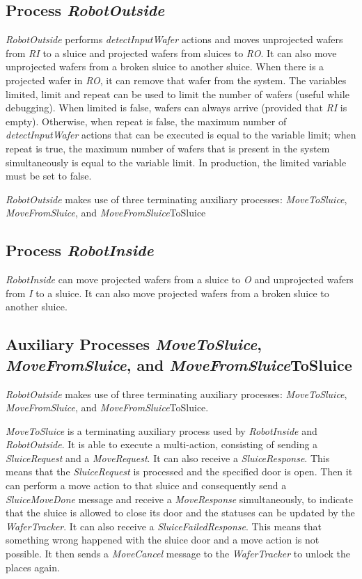 \subsection{Process \emph{RobotOutside}}

 \emph{RobotOutside} performs \emph{detectInputWafer} actions and moves unprojected wafers
 from \emph{RI} to a sluice and projected wafers from sluices to \emph{RO}. It can also
 move unprojected wafers from a broken sluice to another sluice. When there
 is a projected wafer in \emph{RO}, it can remove that wafer from the system. The
 variables limited, limit and repeat can be used to limit the number of
 wafers (useful while debugging). When limited is false, wafers can always
 arrive (provided that \emph{RI} is empty). Otherwise, when repeat is false, the
 maximum number of \emph{detectInputWafer} actions that can be executed is equal to
 the variable limit; when repeat is true, the maximum number of wafers that
 is present in the system simultaneously is equal to the variable limit.
 In production, the limited variable must be set to false.
 
 \emph{RobotOutside} makes use of three terminating auxiliary processes: \emph{MoveToSluice}, \emph{MoveFromSluice}, and \emph{MoveFromSluice}ToSluice
 
\subsection{Process \emph{RobotInside}}

 \emph{RobotInside} can move projected wafers from a sluice to \emph{O} and unprojected
 wafers from \emph{I} to a sluice. It can also move projected wafers from a broken
 sluice to another sluice.

 \subsection{Auxiliary Processes \emph{MoveToSluice}, \emph{MoveFromSluice}, and \emph{MoveFromSluice}ToSluice}

 \emph{RobotOutside} makes use of three terminating auxiliary processes: \emph{MoveToSluice}, \emph{MoveFromSluice}, and \emph{MoveFromSluice}ToSluice.
 
  \emph{MoveToSluice} is a terminating auxiliary process used by \emph{RobotInside} and
 \emph{RobotOutside}. It is able to execute a multi-action, consisting of sending
 a \emph{SluiceRequest} and a \emph{MoveRequest}. It can also receive a \emph{SluiceResponse}.
 This means that the \emph{SluiceRequest} is processed and the specified door is
 open. Then it can perform a move action to that sluice and consequently
 send a \emph{SluiceMoveDone} message and receive a \emph{MoveResponse} simultaneously, to
 indicate that the sluice is allowed to close its door and the statuses can
 be updated by the \emph{WaferTracker}. It can also receive a \emph{SluiceFailedResponse}.
 This means that something wrong happened with the sluice door and a move
 action is not possible. It then sends a \emph{MoveCancel} message to the
 \emph{WaferTracker} to unlock the places again.



